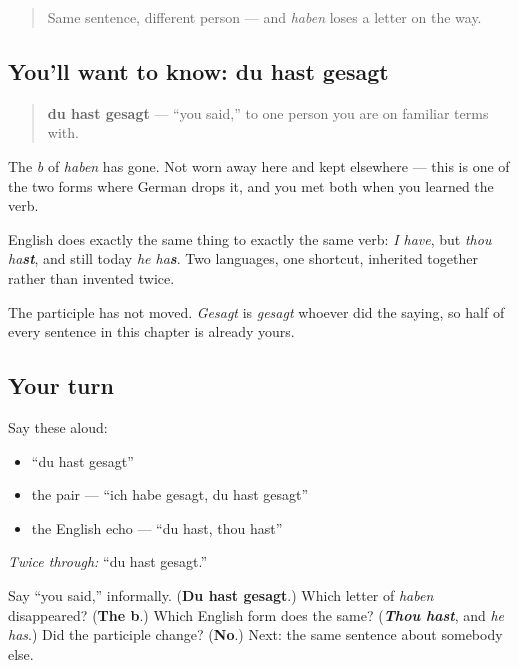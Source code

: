 \begin{quote}
Same sentence, different person — and \emph{haben} loses a letter on the way.
\end{quote}

\subsection*{You'll want to know: du hast gesagt}
\begin{quote}
\textbf{du hast gesagt} — \textquotedblleft{}you said,\textquotedblright{} to one person you are on familiar terms with.
\end{quote}

The \emph{b} of \emph{haben} has gone. Not worn away here and kept elsewhere — this is one of the two forms where German drops it, and you met both when you learned the verb.

English does exactly the same thing to exactly the same verb: \emph{I have}, but \emph{thou ha\textbf{st}}, and still today \emph{he ha\textbf{s}}. Two languages, one shortcut, inherited together rather than invented twice.

The participle has not moved. \emph{Gesagt} is \emph{gesagt} whoever did the saying, so half of every sentence in this chapter is already yours.

\subsection*{Your turn}
Say these aloud:

\begin{itemize}
\raggedright
  \item \textquotedblleft{}du hast gesagt\textquotedblright{}
  \item the pair — \textquotedblleft{}ich habe gesagt, du hast gesagt\textquotedblright{}
  \item the English echo — \textquotedblleft{}du hast, thou hast\textquotedblright{}
\end{itemize}

\emph{Twice through:} \textquotedblleft{}du hast gesagt.\textquotedblright{}

\begin{tcolorbox}[breakable,colback=teal!4,colframe=teal!35!black,title={Before you move on}]
Say \textquotedblleft{}you said,\textquotedblright{} informally. (\textbf{Du hast gesagt}.) Which letter of \emph{haben} disappeared? (\textbf{The b}.) Which English form does the same? (\emph{\textbf{Thou hast}}, and \emph{he has}.) Did the participle change? (\textbf{No}.) Next: the same sentence about somebody else.
\end{tcolorbox}
